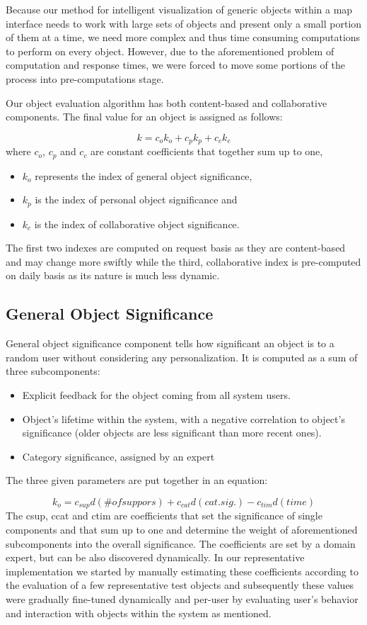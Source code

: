 \documentclass{llncs}
\begin{document}
Because our method for intelligent visualization of generic objects within a map interface needs to work with large sets of objects and present only a small portion of them at a time, we need more complex and thus time consuming computations to perform on every object. However, due to the aforementioned problem of computation and response times, we were forced to move some portions of the process into pre-computations stage.

Our object evaluation algorithm has both content-based and collaborative components. The final value for an object is assigned as follows:

$$k = c_o k_o + c_p k_p + c_c k_c$$ 
where $c_o$, $c_p$ and $c_c$ are constant coefficients that together sum up to one,\\
\begin{itemize}
   \item  $k_o$ represents the index of general object significance,
   \item  $k_p$ is the index of personal object significance and
   \item  $k_c$ is the index of collaborative object significance.
\end{itemize}
The first two indexes are computed on request basis as they are content-based and may change more swiftly while the third, collaborative index is pre-computed on daily basis as its nature is much less dynamic.\\

\subsection{General Object Significance}
General object significance component tells how significant an object is to a random user without considering any personalization. It is computed as a sum of three subcomponents:
\begin{itemize}
   \item  Explicit feedback for the object coming from all system users.
   \item  Object's lifetime within the system, with a negative correlation to object's significance (older objects are less significant than more recent ones).
   \item  Category significance, assigned by an expert
\end{itemize}
The three given parameters are put together in an equation:

$$ k_o = c_{sup}d(\# of suppors) + c_{cat}d(cat.sig.) - c_{tim}d(time) $$ %
The csup, ccat and ctim are coefficients that set the significance of single components and that sum up to one and determine the weight of aforementioned subcomponents into the overall significance. The coefficients are set by a domain expert, but can be also discovered dynamically. In our representative implementation we started by manually estimating these coefficients according to the evaluation of a few representative test objects and subsequently these values were gradually fine-tuned dynamically and per-user by evaluating user’s behavior and interaction with objects within the system as mentioned.
\end{document}
